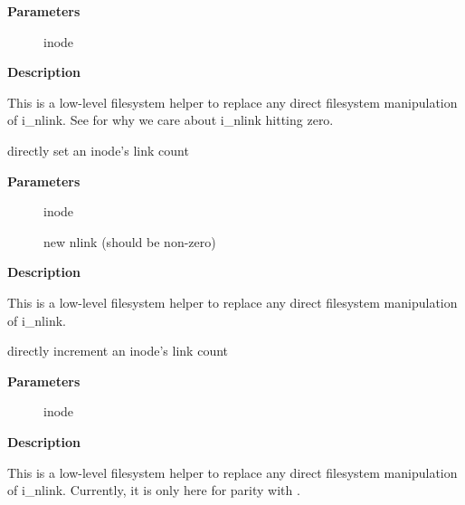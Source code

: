\documentclass[a4paper,8pt,english]{sphinxmanual}
\begin{document}
\textbf{Parameters}
\begin{description}
\item[{}] \leavevmode
inode

\end{description}

\textbf{Description}

This is a low-level filesystem helper to replace any
direct filesystem manipulation of i\_nlink.  See
{\hyperref[filesystems/index:c.drop_nlink]{\emph{}}} for why we care about i\_nlink hitting zero.

\begin{fulllineitems}
\label{filesystems/index:c.set_nlink}
directly set an inode's link count

\end{fulllineitems}


\textbf{Parameters}
\begin{description}
\item[{}] \leavevmode
inode

\item[{}] \leavevmode
new nlink (should be non-zero)

\end{description}

\textbf{Description}

This is a low-level filesystem helper to replace any
direct filesystem manipulation of i\_nlink.

\begin{fulllineitems}
\label{filesystems/index:c.inc_nlink}
directly increment an inode's link count

\end{fulllineitems}


\textbf{Parameters}
\begin{description}
\item[{}] \leavevmode
inode

\end{description}

\textbf{Description}

This is a low-level filesystem helper to replace any
direct filesystem manipulation of i\_nlink.  Currently,
it is only here for parity with .
\end{document}
